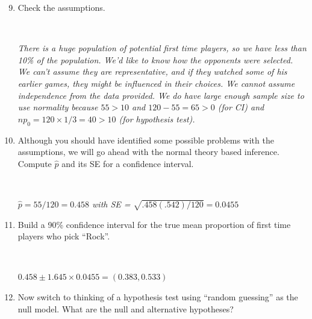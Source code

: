 \begin{enumerate}
 \setcounter{enumi}{8}
 \item  Check the assumptions.
\begin{students}
\\   \vspace{2cm}    
\end{students}

\begin{key} 
 {\it There is a huge population of potential first time players, so
  we have less than 10\% of the population.  We'd like to know how the
  opponents were selected. We can't assume they are representative,
  and if they watched some of his earlier games, they might be
  influenced in their 
  choices. We cannot assume independence from the data provided. We do
have large enough sample size to use normality because $55 > 10$ and
$120-55 = 65>0$ (for CI) and $np_0 = 120\times 1/3 = 40>10$ (for
hypothesis test).}
\end{key}
\item Although you should have identified some possible problems with
  the assumptions, we will go ahead with the normal theory based
  inference. Compute $\widehat{p}$ and its SE for a confidence
  interval.
\begin{students}
    \vspace{1cm}    \\
\end{students}

\begin{key} 
{\it $\widehat{p} = 55/120 = 0.458$ with SE = $\sqrt{.458(.542)/120} =
  0.0455$}
\end{key}
\item Build a 90\% confidence interval for the true mean proportion of
  first time players who pick ``Rock''.
\begin{students}
    \vspace{1cm}    \\
\end{students}

\begin{key} 
{\it $0.458 \pm 1.645 \times 0.0455 = (0.383, 0.533)$}
\end{key}
\item Now switch to thinking of a hypothesis test using ``random
  guessing'' as the null model.  What are the null and alternative
  hypotheses? 
\begin{students}
    \vspace{2cm}    \\
\end{students}


\end{enumerate}
